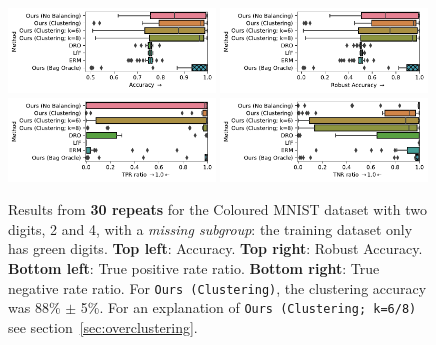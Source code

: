 \begin{figure}[htp]
  \centering
  \includegraphics[width=0.49\textwidth]{supmatch/figures/cmnist/missing_subgroup_oc/cmnist_2v4_miss_s_overcluster_acc.pdf}
  \includegraphics[width=0.49\textwidth]{supmatch/figures/cmnist/missing_subgroup_oc/cmnist_2v4_miss_s_overcluster_acc-min.pdf}
  \includegraphics[width=0.49\textwidth]{supmatch/figures/cmnist/missing_subgroup_oc/cmnist_2v4_miss_s_overcluster_tprr.pdf}
  \includegraphics[width=0.49\textwidth]{supmatch/figures/cmnist/missing_subgroup_oc/cmnist_2v4_miss_s_overcluster_tnrr.pdf}

  \caption{
    Results from \textbf{30 repeats} for the Coloured MNIST dataset with two digits, 2 and 4, with a
    \emph{missing subgroup}: the training dataset only has {\color{green}green} digits.
    \textbf{Top left}: Accuracy.
    \textbf{Top right}: Robust Accuracy.
    \textbf{Bottom left}: True positive rate ratio.
    \textbf{Bottom right}: True negative rate ratio.
    For \texttt{Ours (Clustering)}, the clustering accuracy was 88\% $\pm$ 5\%.
    For an explanation of \texttt{Ours (Clustering; k=6/8)} see section~\ref{sec:overclustering}.
  }%
  \label{fig:cmnist-2v4-miss-s-add}
\end{figure}

